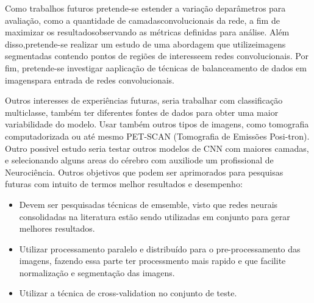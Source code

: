 \documentclass[openright]{UFRGS} %
\begin{document}
Como trabalhos futuros pretende-se estender a variação deparâmetros para avaliação, como a quantidade de camadasconvolucionais da rede, a ﬁm de maximizar os resultadosobservando as métricas deﬁnidas para análise. Além disso,pretende-se realizar um estudo de uma abordagem que utilizeimagens segmentadas contendo pontos de regiões de interesseem redes convolucionais. Por ﬁm, pretende-se investigar aaplicação de técnicas de balanceamento de dados em imagenspara entrada de redes convolucionais.


Outros interesses de experiências futuras, seria trabalhar com classificação multiclasse, também ter  diferentes fontes de dados para obter uma maior variabilidade do modelo. Usar também outros tipos de imagens, como tomografia computadorizada ou até mesmo PET-SCAN (Tomografia de Emissões Posi-tron). Outro possivel estudo seria  testar outros modelos de CNN com maiores camadas, e selecionando
alguns areas do cérebro com auxiliode um profissional de Neurociência. Outros objetivos que podem ser aprimorados  para  pesquisas futuras com intuito  de termos melhor resultados e desempenho:

\begin{itemize}
 \item Devem ser pesquisadas técnicas de emsemble, visto que redes neurais consolidadas
na literatura estão sendo utilizadas em conjunto para gerar melhores resultados.

 \item Utilizar  processamento paralelo e distribuído para o pre-processamento das imagens, fazendo essa parte ter processmento mais
 rapido e que facilite normalização e segmentação das imagens.

\item Utilizar a técnica de cross-validation no conjunto de teste.

\end{itemize}









% 
\end{document}
